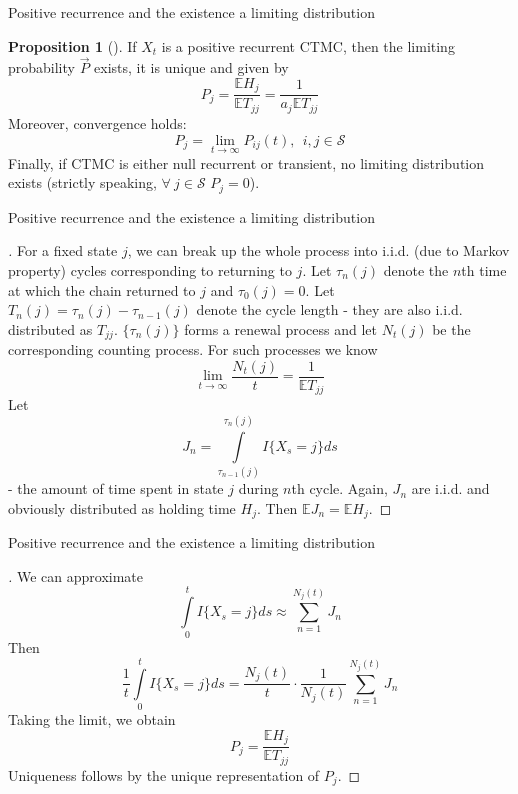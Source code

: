 \documentclass{beamer}%
\theoremstyle{definition}
\newtheorem{proposition}[theorem]{Proposition}
\newcommand{\E}{\mathbb{E}}
\begin{document}
\begin{frame}{Positive recurrence and the existence a limiting distribution}

\begin{proposition}[]
If $X_t$ is a positive recurrent CTMC, then the limiting probability $\vec{P}$ exists, it is unique and given by
$$P_j=\frac{\E H_j}{\E T_{jj}}=\frac{1}{a_j\E T_{jj}}$$
Moreover, convergence holds:
$$P_j=\lim\limits_{t\to\infty}P_{ij}(t), \:\: i, j\in\mathcal{S}$$
Finally, if CTMC is either null recurrent or transient, no limiting distribution exists (strictly speaking, $\forall\: j\in\mathcal{S}$ $P_j=0$).
\end{proposition}

\end{frame}


\begin{frame}{Positive recurrence and the existence a limiting distribution}

\begin{proof}[]
For a fixed state $j$, we can break up the whole process into i.i.d. (due to Markov property) cycles corresponding to returning to $j$. Let $\tau_n(j)$ denote the $n$th time at which the chain returned to $j$ and $\tau_0(j)=0$. Let $T_n(j)=\tau_n(j)-\tau_{n-1}(j)$ denote the cycle length - they are also i.i.d. distributed as $T_{jj}$. $\{\tau_n(j)\}$ forms a renewal process and let $N_t(j)$ be the corresponding counting process. For such processes we know
$$\lim\limits_{t\to\infty}\frac{N_t(j)}{t}=\frac{1}{\E T_{jj}}$$
Let
$$J_n=\int\limits_{\tau_{n-1}(j)}^{\tau_n(j)}I\{X_s=j\}ds$$
- the amount of time spent in state $j$ during $n$th cycle. Again, $J_n$ are i.i.d. and obviously distributed as holding time $H_j$. Then $\E J_n=\E H_j$.
\end{proof}

\end{frame}


\begin{frame}{Positive recurrence and the existence a limiting distribution}

\begin{proof}[]
We can approximate
$$\int\limits_0^tI\{X_s=j\}ds\approx\sum\limits_{n=1}^{N_j(t)}J_n$$
Then
$$\frac{1}{t}\int\limits_0^tI\{X_s=j\}ds=\frac{N_j(t)}{t}\cdot\frac{1}{N_j(t)}\sum\limits_{n=1}^{N_j(t)}J_n$$
Taking the limit, we obtain
$$P_j=\frac{\E H_j}{\E T_{jj}}$$
Uniqueness follows by the unique representation of $P_j$.
\end{proof}

\end{frame}
\end{document}
